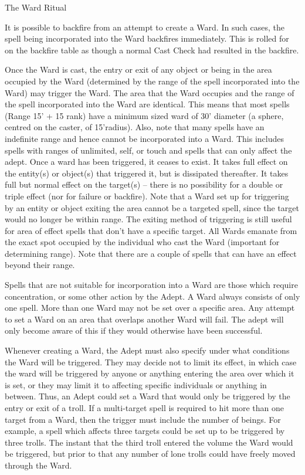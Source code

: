 \begin{multicols}{3}
\begin{ritual}[]{The Ward Ritual}
\begin{effects}
It is possible to backfire from an attempt to create a Ward.  In such
cases, the spell being incorporated into the Ward backfires
immediately. This is rolled for on the backfire table as though a
normal Cast Check had resulted in the backfire.

Once the Ward is cast, the entry or exit of any object or being in the
area occupied by the Ward (determined by the range of the spell
incorporated into the Ward) may trigger the Ward.  The area that the
Ward occupies and the range of the spell incorporated into the Ward
are identical.  This means that most spells (Range 15' + 15 rank) have
a minimum sized ward of 30' diameter (a sphere, centred on the caster,
of 15'radius).  Also, note that many spells have an indefinite range
and hence cannot be incorporated into a Ward.  This includes spells
with ranges of unlimited, self, or touch and spells that can only
affect the adept.  Once a ward has been triggered, it ceases to
exist. It takes full effect on the entity(s) or object(s) that
triggered it, but is dissipated thereafter. It takes full but normal
effect on the target(s) -- there is no possibility for a double or
triple effect (nor for failure or backfire).  Note that a Ward set up
for triggering by an entity or object exiting the area cannot be a
targeted spell, since the target would no longer be within range. The
exiting method of triggering is still useful for area of effect spells
that don't have a specific target.  All Wards emanate from the exact
spot occupied by the individual who cast the Ward (important for
determining range).  Note that there are a couple of spells that can
have an effect beyond their range.

Spells that are not suitable for incorporation into a Ward are those
which require concentration, or some other action by the Adept.  A
Ward always consists of only one spell. More than one Ward may not be
set over a specific area. Any attempt to set a Ward on an area that
overlaps another Ward will fail. The adept will only become aware of
this if they would otherwise have been successful.

Whenever creating a Ward, the Adept must also specify under what
conditions the Ward will be triggered.  They may decide not to limit
its effect, in which case the ward will be triggered by anyone or
anything entering the area over which it is set, or they may limit it
to affecting specific individuals or anything in between.  Thus, an
Adept could set a Ward that would only be triggered by the entry or
exit of a troll. If a multi-target spell is required to hit more than
one target from a Ward, then the trigger must include the number of
beings.  For example, a spell which affects three targets could be set
up to be triggered by three trolls.  The instant that the third troll
entered the volume the Ward would be triggered, but prior to that any
number of lone trolls could have freely moved through the Ward.


\end{effects}
\end{ritual}
\end{multicols}

